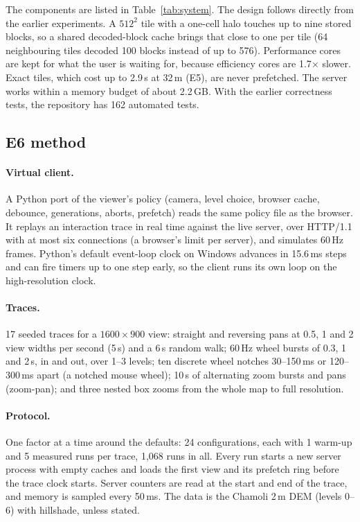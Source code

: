 \documentclass[11pt,a4paper]{article}
\begin{document}
The components are listed in Table~\ref{tab:system}. The design follows directly from the earlier experiments. A
$512^2$ tile with a one-cell halo touches up to nine stored blocks, so a shared decoded-block cache brings that close
to one per tile (64 neighbouring tiles decoded 100 blocks instead of up to 576). Performance cores are kept for what
the user is waiting for, because efficiency cores are 1.7$\times$ slower. Exact tiles, which cost up to 2.9\,s at
32\,m (E5), are never prefetched. The server works within a memory budget of about 2.2\,GB. With the earlier
correctness tests, the repository has 162 automated tests.

\subsection{E6 method}
\paragraph{Virtual client.} A Python port of the viewer's policy (camera, level choice, browser cache, debounce,
generations, aborts, prefetch) reads the same policy file as the browser. It replays an interaction trace in real
time against the live server, over HTTP/1.1 with at most six connections (a browser's limit per server), and
simulates 60\,Hz frames. Python's default event-loop clock on Windows advances in 15.6\,ms steps and can fire timers
up to one step early, so the client runs its own loop on the high-resolution clock.

\paragraph{Traces.} 17 seeded traces for a $1600\times900$ view: straight and reversing pans at 0.5, 1 and 2 view
widths per second (5\,s) and a 6\,s random walk; 60\,Hz wheel bursts of 0.3, 1 and 2\,s, in and out, over 1--3
levels; ten discrete wheel notches 30--150\,ms or 120--300\,ms apart (a notched mouse wheel); 10\,s of alternating
zoom bursts and pans (zoom-pan); and three nested box zooms from the whole map to full resolution.

\paragraph{Protocol.} One factor at a time around the defaults: 24 configurations, each with 1 warm-up and 5 measured
runs per trace, 1{,}068 runs in all. Every run starts a new server process with empty caches and loads the first view
and its prefetch ring before the trace clock starts. Server counters are read at the start and end of the trace, and
memory is sampled every 50\,ms. The data is the Chamoli 2\,m DEM (levels 0--6) with hillshade, unless stated.
\end{document}
